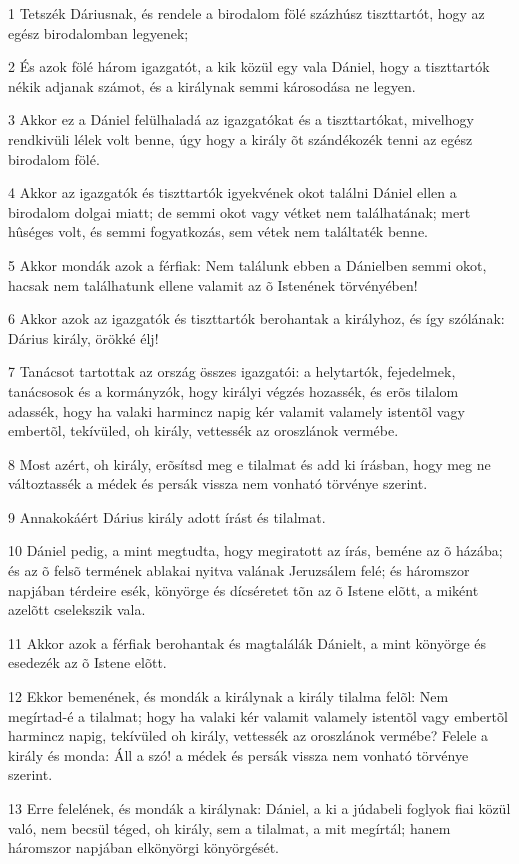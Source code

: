 \par 1 Tetszék Dáriusnak, és rendele a birodalom fölé százhúsz tiszttartót, hogy az egész birodalomban legyenek;
\par 2 És azok fölé három igazgatót, a kik közül egy vala Dániel, hogy a tiszttartók nékik adjanak számot, és a királynak semmi károsodása ne legyen.
\par 3 Akkor ez a Dániel felülhaladá az igazgatókat és a tiszttartókat, mivelhogy rendkivüli lélek volt benne, úgy hogy a király õt szándékozék tenni az egész birodalom fölé.
\par 4 Akkor az igazgatók és tiszttartók igyekvének okot találni Dániel ellen a birodalom dolgai miatt; de semmi okot vagy vétket nem találhatának; mert hûséges volt, és semmi fogyatkozás, sem vétek nem találtaték benne.
\par 5 Akkor mondák azok a férfiak: Nem találunk ebben a Dánielben semmi okot, hacsak nem találhatunk ellene valamit az õ Istenének törvényében!
\par 6 Akkor azok az igazgatók és tiszttartók berohantak a királyhoz, és így szólának: Dárius király, örökké élj!
\par 7 Tanácsot tartottak az ország összes igazgatói: a helytartók, fejedelmek, tanácsosok és a kormányzók, hogy királyi végzés hozassék, és erõs tilalom adassék, hogy ha valaki harmincz napig kér valamit valamely istentõl vagy embertõl, tekívüled, oh király, vettessék az oroszlánok vermébe.
\par 8 Most azért, oh király, erõsítsd meg e tilalmat és add ki írásban, hogy meg ne változtassék a médek és persák vissza nem vonható törvénye szerint.
\par 9 Annakokáért Dárius király adott írást és tilalmat.
\par 10 Dániel pedig, a mint megtudta, hogy megiratott az írás, beméne az õ házába; és az õ felsõ termének ablakai nyitva valának Jeruzsálem felé; és háromszor  napjában térdeire esék, könyörge és dícséretet tõn az õ Istene elõtt, a miként azelõtt cselekszik vala.
\par 11 Akkor azok a férfiak berohantak és magtalálák Dánielt, a mint könyörge és esedezék az õ Istene elõtt.
\par 12 Ekkor bemenének, és mondák a királynak a király tilalma felõl: Nem megírtad-é a tilalmat; hogy ha valaki kér valamit valamely istentõl vagy embertõl harmincz napig, tekívüled oh király, vettessék az oroszlánok vermébe? Felele a király és monda: Áll a szó! a médek és persák vissza nem vonható törvénye szerint.
\par 13 Erre felelének, és mondák a királynak: Dániel, a ki a júdabeli foglyok  fiai közül való, nem becsül téged, oh király, sem a tilalmat, a mit megírtál; hanem háromszor napjában elkönyörgi könyörgését.

